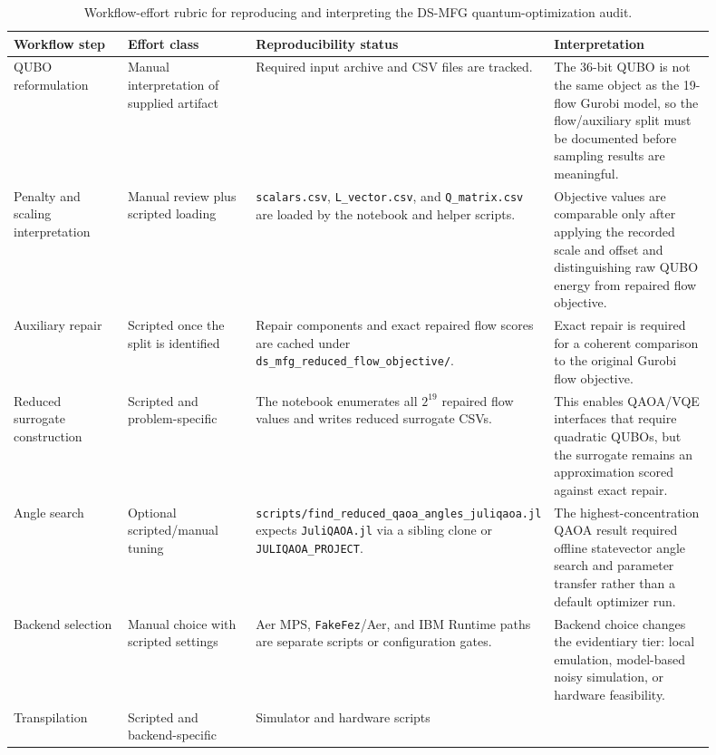 \begin{table}[t]
\centering
\scriptsize
\caption{Workflow-effort rubric for reproducing and interpreting the DS-MFG
quantum-optimization audit.}
\label{tab:ds-mfg-workflow-effort}
\begin{tabular}{p{0.18\linewidth}p{0.20\linewidth}p{0.25\linewidth}p{0.27\linewidth}}
\hline
Workflow step & Effort class & Reproducibility status & Interpretation \\
\hline
QUBO reformulation & Manual interpretation of supplied artifact & Required
input archive and CSV files are tracked. & The 36-bit QUBO is not the same
object as the 19-flow Gurobi model, so the flow/auxiliary split must be
documented before sampling results are meaningful. \\
\hline
Penalty and scaling interpretation & Manual review plus scripted loading &
\texttt{scalars.csv}, \texttt{L\_vector.csv}, and \texttt{Q\_matrix.csv} are
loaded by the notebook and helper scripts. & Objective values are comparable
only after applying the recorded scale and offset and distinguishing raw QUBO
energy from repaired flow objective. \\
\hline
Auxiliary repair & Scripted once the split is identified & Repair components
and exact repaired flow scores are cached under
\texttt{ds\_mfg\_reduced\_flow\_objective/}. & Exact repair is required for a
coherent comparison to the original Gurobi flow objective. \\
\hline
Reduced surrogate construction & Scripted and problem-specific & The notebook
enumerates all $2^{19}$ repaired flow values and writes reduced surrogate CSVs.
& This enables QAOA/VQE interfaces that require quadratic QUBOs, but the
surrogate remains an approximation scored against exact repair. \\
\hline
Angle search & Optional scripted/manual tuning &
\texttt{scripts/find\_reduced\_qaoa\_angles\_juliqaoa.jl} expects
\texttt{JuliQAOA.jl} via a sibling clone or \texttt{JULIQAOA\_PROJECT}. & The
highest-concentration QAOA result required offline statevector angle search and parameter
transfer rather than a default optimizer run. \\
\hline
Backend selection & Manual choice with scripted settings & Aer MPS,
\texttt{FakeFez}/Aer, and IBM Runtime paths are separate scripts or
configuration gates. & Backend choice changes the evidentiary tier: local
emulation, model-based noisy simulation, or hardware feasibility. \\
\hline
Transpilation & Scripted and backend-specific & Simulator and hardware scripts

\end{tabular}
\end{table}
